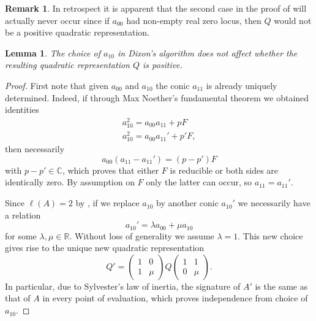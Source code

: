 \documentclass[a4paper,10pt]{amsart}
\theoremstyle{definition}
\newtheorem{rem}[Def]{Remark}
\theoremstyle{plain}
\newtheorem{lem}[Def]{Lemma}
\newcommand{\C}{{\mathbb C}}
\newcommand{\R}{{\mathbb R}}
\begin{document}
\begin{rem}
    In retrospect it is apparent that the second case in the proof of  will actually never occur since if $a_{00}$ had non-empty real zero locus, then $Q$ would not be a positive quadratic representation.
\end{rem}

\begin{lem} \label{lem:indep}
    The choice of $a_{10}$ in Dixon's algorithm does not affect whether the resulting quadratic representation $Q$ is positive.
\end{lem}

\begin{proof}
    First note that given $a_{00}$ and $a_{10}$ the conic $a_{11}$ is already uniquely determined. Indeed, if through Max Noether's fundamental theorem we obtained identities
    \begin{align*}
        a_{10}^2 = a_{00}a_{11} + pF \\
        a_{10}^2 = a_{00}a_{11}' + p'F,
    \end{align*}
    then necessarily
    \begin{equation*}
        a_{00}(a_{11} - a_{11}') = (p-p')F
    \end{equation*}
    with $p - p' \in \C$, which proves that either $F$ is reducible or both sides are identically zero. By assumption on $F$ only the latter can occur, so $a_{11} = a_{11}'$.

    Since $\ell(A) = 2$ by , if we replace $a_{10}$ by another conic $a_{10}'$ we necessarily have a relation
    \begin{equation*}
        {a_{10}'} = \lambda a_{00} + \mu a_{10}
    \end{equation*}
    for some $\lambda, \mu \in \R$. Without loss of generality we assume $\lambda = 1$. This new choice gives rise to the unique new quadratic representation
    \begin{equation*}
        Q' = \begin{pmatrix}
            1 & 0 \\
            1 & \mu
        \end{pmatrix} Q \begin{pmatrix}
            1 & 1 \\
            0 & \mu
        \end{pmatrix}.
    \end{equation*}
    In particular, due to Sylvester's law of inertia, the signature of $A'$ is the same as that of $A$ in every point of evaluation, which proves independence from choice of $a_{10}$.
\end{proof}
\end{document}

